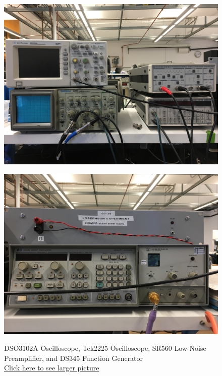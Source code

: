 \documentclass{../lab}
\begin{document}
\begin{figure}[!htb]
  \href{http://experimentationlab.berkeley.edu/sites/default/files/JOS_3507_Preamp_scope_function_generator.JPG}{\includegraphics[width=\linewidth,keepaspectratio]{images/JOS_3507_Preamp_scope_function_generator.JPG}}
  \caption{DSO3102A Oscilloscope, Tek2225 Oscilloscope, SR560 Low-Noise Preamplifier, and DS345 Function Generator\\ \href{http://experimentationlab.berkeley.edu/sites/default/files/JOS_3507_Preamp_scope_function_generator.JPG}{Click here to see larger picture}}
  \label{fig:JOS_3507_Preamp_scope_function_generator.JPG}
\endminipage\hfill
{}
  \href{http://experimentationlab.berkeley.edu/sites/default/files/JOS_3507_Power_Sweep_RF.JPG}{\includegraphics[width=\linewidth,keepaspectratio]{images/JOS_3507_Power_Sweep_RF.JPG}}

\end{figure}
\end{document}
